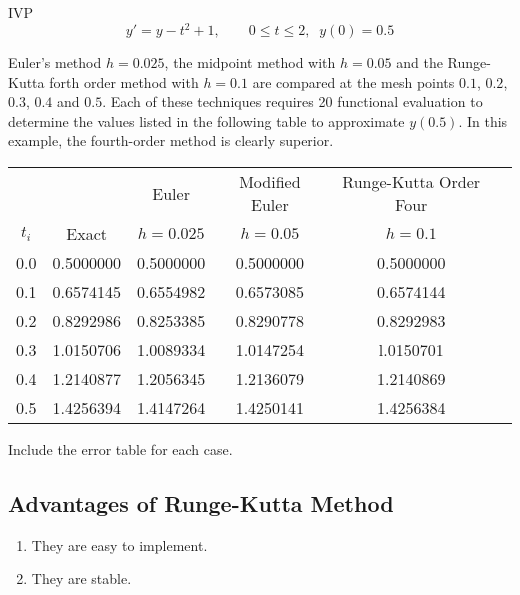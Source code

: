 \documentclass[../main-sheet.tex]{subfiles}
\begin{document}
\begin{ex}
    IVP
    \[
        y'=y-t^2+1,\qquad 0\leq t\leq 2,\;\;y(0)=0.5
    \]

    Euler's method \(h=0.025\), the midpoint method with \(h=0.05\) and the Runge-Kutta forth order method with \(h=0.1\) are compared at the mesh points \(0.1\), \(0.2\), \(0.3\), \(0.4\) and \(0.5\).
    Each of these techniques requires 20 functional evaluation to determine the values listed in the following table to approximate \(y(0.5)\).
    In this example, the fourth-order method is clearly superior.
    \begin{table}[H]
        \centering
        \begin{tabular}{cccccc}
            \toprule
                &            & Euler      & Modified Euler & Runge-Kutta Order Four &\\
            \(t_i\) & Exact  & \(h=0.025\)& \(h=0.05\) & \(h=0.1\) &  \\\midrule
            0.0 & 0.5000000  & 0.5000000  & 0.5000000  & 0.5000000 &  \\
            0.1 & 0.6574145  & 0.6554982  & 0.6573085  & 0.6574144 &  \\
            0.2 & 0.8292986  & 0.8253385  & 0.8290778  & 0.8292983 &  \\
            0.3 & 1.0150706  & 1.0089334  & 1.0147254  & l.0150701 &  \\
            0.4 & 1.2140877  & 1.2056345  & 1.2136079  & 1.2140869 &  \\
            0.5 & 1.4256394  & 1.4147264  & 1.4250141  & 1.4256384 &  \\\bottomrule
            \end{tabular}
    \end{table}
    \begin{note}
        Include the error table for each case.
    \end{note}
\end{ex}
\subsection{Advantages of Runge-Kutta Method}
\begin{enumerate}
    \item They are easy to implement.
    \item They are stable.
\end{enumerate}
\end{document}
